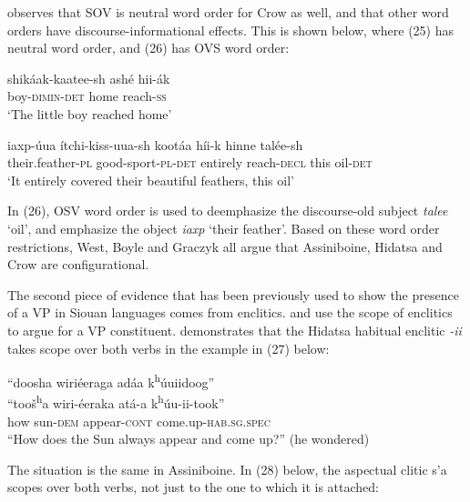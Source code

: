 \documentclass[output=paper]{LSP/langsci}
\begin{document}
\citet{Graczyk1991} observes that SOV is neutral word order for Crow as well, and that other word orders have discourse-informational effects.  This is shown below, where (25) has neutral word order, and (26) has OVS word order:

\begin{exe}
\ex \gll shik\'aak-kaatee-sh ash\'e 		hii-\'ak \\
boy-\textsc{dimin-det} 		home 	reach-\textsc{ss} \\
\trans `The little boy reached home' \citep[101]{Graczyk1991}

\ex \gll iaxp-\'uua 		\'itchi-kiss-uua-sh			koot\'aa 	h\'ii-k 	hinne		tal\'ee-sh \\
their.feather-\textsc{pl} good-sport-\textsc{pl}-\textsc{det}		entirely 	reach-\textsc{decl}	this 	oil-\textsc{det} \\
\trans `It entirely covered their beautiful feathers, this oil' \citep[103]{Graczyk1991}
\end{exe}

In (26), OSV word order is used to deemphasize the discourse-old subject \textit{talee} `oil', and emphasize the object \textit{iaxp} `their feather'.  Based on these word order restrictions, West, Boyle and Graczyk all argue that Assiniboine, Hidatsa and Crow are configurational. 
	
The second piece of evidence that has been previously used to show the presence of a VP in Siouan languages comes from enclitics. \citet{West2003} and \citet{Boyle2007} use the scope of enclitics to argue for a VP constituent. \citet{Boyle2007} demonstrates that the Hidatsa habitual enclitic \textit{-ii} takes scope over both verbs in the example in (27) below:

\begin{exe}
\ex 
\glll ``doosha	wiri\'eeraga 	ad\'aa 	 k\textsuperscript{h}\'uuiidoog''\\
``too\v{s}\textsuperscript{h}a 	wiri-\'eeraka 	at\'a-a k\textsuperscript{h}\'uu-ii-took'' \\
how 	sun-\textsc{dem} 	appear-\textsc{cont}  come.up-\textsc{hab.sg.spec} \\
\trans ``How does the Sun always appear and come up?'' (he wondered) \citep[223]{Boyle2007}
\end{exe}

The situation is the same in Assiniboine.  In (28) below, the aspectual clitic s'a scopes over both verbs, not just to the one to which it is attached:
\end{document}

